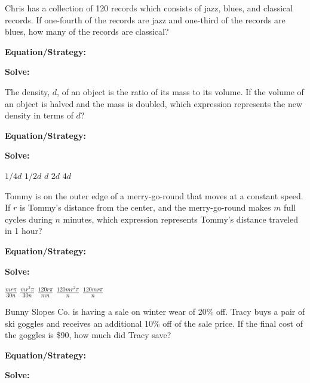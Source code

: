 \vfill
\newpage
\begin{multicols*}{2}
\begin{outline}[enumerate]
\medium

\1 Chris has a collection of 120 records which consists of jazz, blues, and classical records. If one-fourth of the records are jazz and one-third of the records are blues, how many of the records are classical?

\bigskip
\textbf{Equation/Strategy:} \hrulefill

\bigskip
\textbf{Solve:}

\vfill
{}

\midline

\1 The density, $d$, of an object is the ratio of its mass to its volume. If the volume of an object is halved and the mass is doubled, which expression represents the new density in terms of $d$?

\bigskip
\textbf{Equation/Strategy:} \hrulefill

\bigskip
\textbf{Solve:}

\vfill
\2 $1/4d$
\2 $1/2d$
\2 $d$
\2 $2d$
\2 $4d$

\columnbreak
\advanced

\1 Tommy is on the outer edge of a merry-go-round that moves at a constant speed. If $r$ is Tommy's distance from the center, and the merry-go-round makes $m$ full cycles during $n$ minutes, which expression represents Tommy's distance traveled in 1 hour?

\bigskip
\textbf{Equation/Strategy:} \hrulefill

\bigskip
\textbf{Solve:}

\vfill
\2 $\frac{mr\pi}{30n}$
\2 $\frac{mr^2\pi}{30n}$
\2 $\frac{120r\pi}{mn}$
\2 $\frac{120mr^2\pi}{n}$
\2 $\frac{120mr\pi}{n}$

\midline

\1 Bunny Slopes Co. is having a sale on winter wear of 20\% off. Tracy buys a pair of ski goggles and receives an additional 10\% off of the sale price. If the final cost of the goggles is \$90, how much did Tracy save?

\bigskip
\textbf{Equation/Strategy:}

\bigskip
\textbf{Solve:}

\vfill
{}
\end{outline}
\end{multicols*}